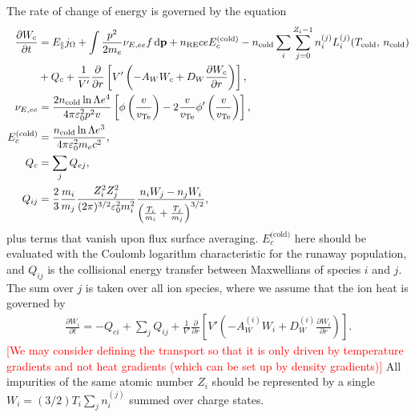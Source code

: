 \documentclass[11pt,a4paper]{article}
\newcommand{\rd}{\ensuremath{\mathrm{d}}}
\newcommand{\sub}[1]{\ensuremath{_{\text{#1}}}}
\renewcommand{\b}[1]{\ensuremath{ {\bf #1 } }}
\begin{document}
The rate of change of energy is governed by the equation
\begin{align}
\frac{\partial W_c}{\partial t} &= E_\parallel j_\Omega + \int  \frac{p^2}{2m_e}\nu_{E,ee} f \,\rd \b{p}  + n\sub{RE} ceE_c^\text{(cold)} - 
n\sub{cold} \sum_i \sum_{j=0}^{Z_i-1} n_i^{(j)} L_{i}^{(j)}(T\sub{cold},\,n\sub{cold})  \nonumber \\
&+ Q_c +  \frac{1}{V'}\frac{\partial}{\partial r}\left[V'\left(-A_W W_c + D_W\frac{\partial W_c}{\partial r}\right)\right], \nonumber \\
\nu_{E,ee} &= \frac{2 n\sub{cold}\ln\Lambda e^4}{4\pi\varepsilon_0^2 p^2 v} \left[\phi\left(\frac{v}{v\sub{Te}}\right) - 2\frac{v}{v\sub{Te}}\phi'\left(\frac{v}{v\sub{Te}}\right)\right], \nonumber \\
E_c^\text{(cold)} &= \frac{n\sub{cold}\ln\Lambda e^3}{4\pi\varepsilon_0^2 m_e c^2}, \nonumber \\
Q_c &= \sum_j Q_{ej}, \nonumber\\
Q_{ij} &= \frac{2}{3}\frac{m_i}{m_j} \frac{Z_i^2 Z_j^2}{(2\pi)^{3/2}\varepsilon_0^2 m_i^2}\frac{n_iW_j-n_jW_i}{\left(\frac{T_i}{m_i}+\frac{T_j}{m_j}\right)^{3/2}},
\end{align}
plus terms that vanish upon flux surface averaging. $E_c^\text{(cold)}$ here should be evaluated with the Coulomb logarithm characteristic for the runaway population, and $Q_{ij}$ is the collisional energy transfer between Maxwellians of species $i$ and $j$. The sum over $j$ is taken over all ion species, where we assume that the ion heat is governed by 
\begin{align}
\frac{\partial W_i}{\partial t} = -Q_{ei} + \sum_j Q_{ij} +\frac{1}{V'}\frac{\partial}{\partial r}\left[V'\left(-A_W^{(i)} W_i + D_W^{(i)}\frac{\partial W_i}{\partial r}\right)\right].
\end{align}
\textcolor{red}{[We may consider defining the transport so that it is only driven by temperature gradients and not heat gradients (which can be set up by density gradients)]} All impurities of the same atomic number $Z_i$ should be represented by a single $W_i = (3/2)T_i \sum_j n_i^{(j)}$ summed over charge states. 
\end{document}
